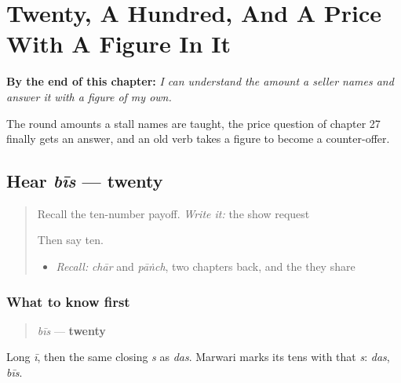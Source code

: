 
\chapter{Twenty, A Hundred, And A Price With A Figure In It}
\label{ch:mw-numbered-price}

\begin{chapteropening}
\textbf{By the end of this chapter:} \emph{I can understand the amount a seller names and answer it with a figure of my own.}

The round amounts a stall names are taught, the price question of chapter 27 finally gets an answer, and an old verb takes a figure to become a counter-offer.
\end{chapteropening}

\section[bīs]{Hear \emph{bīs} — twenty}

\label{lesson:MW-C34-hear-bees}



\begin{quote}
Recall the ten-number payoff. \emph{Write it:} the show request

Then say ten.

\begin{itemize}
\raggedright
  \item \emph{Recall:} \emph{chār} and \emph{pāṅch}, two chapters back, and the \textbf{} they share
\end{itemize}
\end{quote}

\subsection*{What to know first}
\begin{quote}
\emph{bīs} — \textbf{twenty}
\end{quote}

Long \emph{ī}, then the same closing \emph{s} as \emph{das}. Marwari marks its tens with that \emph{s}: \emph{das}, \emph{bīs}.

